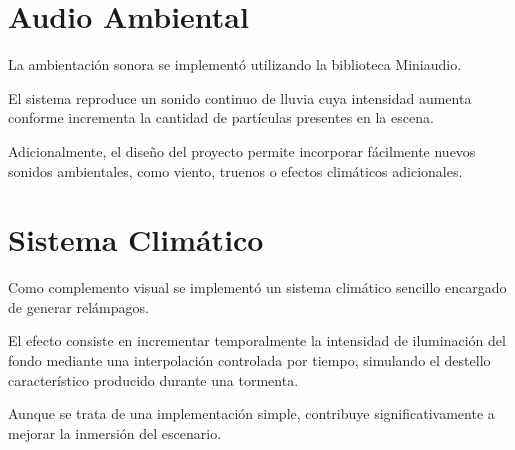 \section{Audio Ambiental}

La ambientación sonora se implementó utilizando la biblioteca Miniaudio.

El sistema reproduce un sonido continuo de lluvia cuya intensidad aumenta conforme incrementa la cantidad de partículas presentes en la escena.

Adicionalmente, el diseño del proyecto permite incorporar fácilmente nuevos sonidos ambientales, como viento, truenos o efectos climáticos adicionales.

\section{Sistema Climático}

Como complemento visual se implementó un sistema climático sencillo encargado de generar relámpagos.

El efecto consiste en incrementar temporalmente la intensidad de iluminación del fondo mediante una interpolación controlada por tiempo, simulando el destello característico producido durante una tormenta.

Aunque se trata de una implementación simple, contribuye significativamente a mejorar la inmersión del escenario.
